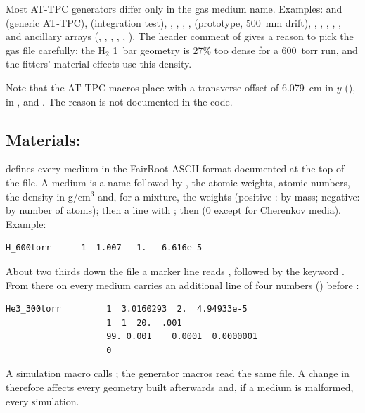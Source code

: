 Most AT-TPC generators differ only in the gas medium name. Examples:  and
 (generic AT-TPC),  (integration test),
, , ,
,  (prototype, 500~mm drift),
, , , ,
, and ancillary arrays (, ,
, , , ). The header comment of
 gives a reason to pick the gas file carefully: the H$_2$ 1~bar geometry is
27\% too dense for a 600~torr run, and the fitters' material effects use this density.

Note that the AT-TPC macros place  with a transverse offset of
6.079~cm in $y$ (), in ,
 and . The reason is not documented in the code.

\subsection{Materials: }
\label{sec:geo-media}

 defines every medium in the FairRoot ASCII format documented at the top of
the file. A medium is a name followed by , the atomic weights, atomic numbers, the density
in g/cm$^3$ and, for a mixture, the weights (positive : by mass; negative: by number of
atoms); then a line with ; then  (0 except for Cherenkov
media). Example:
\begin{verbatim}
H_600torr	   1  1.007   1.   6.616e-5
\end{verbatim}
About two thirds down the file a marker line reads
, followed by the keyword
. From there on every medium carries an additional line of four numbers
() before :
\begin{verbatim}
He3_300torr         1  3.0160293  2.  4.94933e-5
                    1  1  20.  .001
                    99. 0.001    0.0001  0.0000001
                    0
\end{verbatim}
A simulation macro calls ; the generator macros read the same
file. A change in  therefore affects every geometry built afterwards and, if a medium
is malformed, every simulation.

